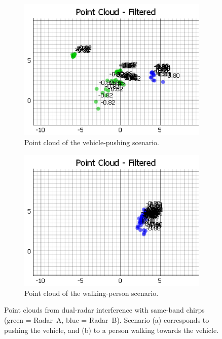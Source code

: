 \begin{figure}[!htbp]
    \centering
    \begin{subfigure}{0.48\linewidth}
        \includegraphics[width=\linewidth]{images/DualSensorSameConfigPointCloud.png}
        \caption{Point cloud of the vehicle-pushing scenario.}
        \label{fig:dual_samechirp_pointcloud}
    \end{subfigure}
    \hfill
    \begin{subfigure}{0.48\linewidth}
        \includegraphics[width=\linewidth]{images/DualSensorSameConfigPointCloudPerson.png}
        \caption{Point cloud of the walking-person scenario.}
        \label{fig:dual_samechirp_cluster}
    \end{subfigure}
    \caption{Point clouds from dual-radar interference with same-band chirps (green = Radar~A, blue = Radar~B).  
    Scenario (a) corresponds to pushing the vehicle, and (b) to a person walking towards the vehicle.}
    \label{fig:dual_samechirp_results}
\end{figure}

